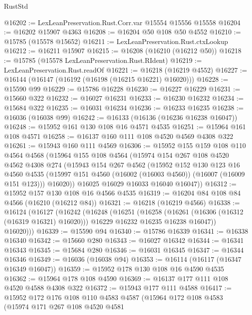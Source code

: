 \begin{lexlean}{RustStd}
\begin{coremodule}
@16202 := LexLeanPreservation.Rust.Corr.var @15554 @15556 @15558
@16204 := @16202 @15907 @4363
@16208 := @16204 @50 @108 @50 @4552
@16210 := @15785 (@15578 @15652)
@16211 := LexLeanPreservation.Rust.ctxLookup
@16212 := @16211 @15907
@16215 := @16208 (@16210 (@16212 @50))
@16218 := @15785 (@15578 LexLeanPreservation.Rust.RIdent)
@16219 := LexLeanPreservation.Rust.readOf
@16221 := @16218 (@16219 @4552)
@16227 := @16144 (@16147 (@16192 (@16198 (@16215 @16221) @16020)))
@16228 := @15590 @99
@16229 := @15786 @16228
@16230 := @16227 @16229
@16231 := @15660 @322
@16232 := @16027 @16231
@16233 := @16230 @16232
@16234 := @15684 @322
@16235 := @16031 @16234
@16236 := @16233 @16235
@16238 := @16036 (@16038 @99)
@16242 := @16133 (@16136 (@16236 @16238 @16047))
@16248 := @15952 @161 @130 @108 @16 @4571 @4535
@16251 := @15964 @161 @108 @4571
@16258 := @16137 @160 @111 @108 @4520 @4569 @4308 @322
@16261 := @15943 @160 @111 @4569
@16306 := @15952
    @155
    @159
    @108
    @110
    @4564
    @4568
    (@15964
      @155
      @108
      @4564
      (@15974
        @154
        @267
        @108
        @4520
        @4562
        @4308
        @274
        (@15943
          @154
          @267
          @4562
          (@15952
            @152
            @130
            @123
            @16
            @4560
            @4535
            (@15997 @151 @4560 (@16002 (@16003 @4560)) (@16007 (@16009 @151 @123)))
            @16020))
        @16025
        @16029
        @16033
        @16040
        @16047))
@16312 := @15952 @157 @130 @108 @16 @4566 @4535
@16319 := @16204 @84 @108 @84 @4566 (@16210 (@16212 @84))
@16321 := @16218 (@16219 @4566)
@16338 := @16124
    (@16127
      (@16242
        (@16248
          (@16251
            (@16258
              (@16261 (@16306 (@16312 (@16319 @16321) @16020)))
              @16229
              @16232
              @16235
              @16238
              @16047))
          @16020)))
@16339 := @15590 @94
@16340 := @15786 @16339
@16341 := @16338 @16340
@16342 := @15660 @280
@16343 := @16027 @16342
@16344 := @16341 @16343
@16345 := @15684 @280
@16346 := @16031 @16345
@16347 := @16344 @16346
@16349 := @16036 (@16038 @94)
@16353 := @16114 (@16117 (@16347 @16349 @16047))
@16359 := @15952 @178 @130 @108 @16 @4590 @4535
@16362 := @15964 @178 @108 @4590
@16369 := @16137 @177 @111 @108 @4520 @4588 @4308 @322
@16372 := @15943 @177 @111 @4588
@16417 := @15952
    @172
    @176
    @108
    @110
    @4583
    @4587
    (@15964
      @172
      @108
      @4583
      (@15974
        @171
        @267
        @108
        @4520
        @4581

\end{coremodule}
\end{lexlean}
